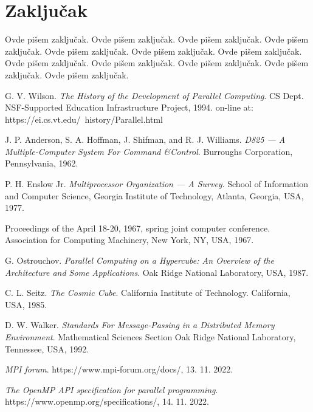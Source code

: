 \documentclass[a4paper]{article}
\begin{document}
{	\section{Zaključak}
	\label{sec:zakljucak}
	Ovde pišem zaključak. 
	Ovde pišem zaključak. 
	Ovde pišem zaključak. 
	Ovde pišem zaključak. 
	Ovde pišem zaključak. 
	Ovde pišem zaključak. 
	Ovde pišem zaključak. 
	Ovde pišem zaključak. 
	Ovde pišem zaključak. 
	Ovde pišem zaključak. 
	Ovde pišem zaključak. 
	Ovde pišem zaključak. 
	
	\appendix
	
	\iffalse
	 
	
	\fi
	
	\begin{thebibliography}{50}
		
		 G. V. Wilson. \emph{The History of the Development of Parallel Computing}. CS Dept. NSF-Supported Education Infrastructure Project, 1994. on-line at: https://ei.cs.vt.edu/~history/Parallel.html
		
		 J. P. Anderson, S. A. Hoffman, J. Shifman, and R. J. Williams. \emph{D825 — A Multiple-Computer System For Command \&Control}. Burroughs Corporation, Pennsylvania, 1962.
		
		 P. H. Enslow Jr. \emph{Multiprocessor Organization — A Survey}. School of Information and Computer Science, Georgia Institute of Technology, Atlanta, Georgia, USA, 1977.
		
		 Proceedings of the April 18-20, 1967, spring joint computer conference. Association for Computing Machinery, New York, NY, USA, 1967.
		
		 G. Ostrouchov. \emph{Parallel Computing on a Hypercube: An Overview of the Architecture and Some Applications}. Oak Ridge National Laboratory, USA, 1987.
		
		 C. L. Seitz. \emph{The Cosmic Cube}. California Institute of Technology. California, USA, 1985.
		
		 D. W. Walker. \emph{Standards For Message-Passing in a Distributed Memory Environment}. Mathematical Sciences Section Oak Ridge National Laboratory, Tennessee, USA, 1992.
		
		 \emph{MPI forum}. https://www.mpi-forum.org/docs/, 13. 11. 2022.
		
		 \emph{The OpenMP API specification for parallel programming}. https://www.openmp.org/specifications/, 14. 11. 2022.
		

\end{thebibliography}}
\end{document}

